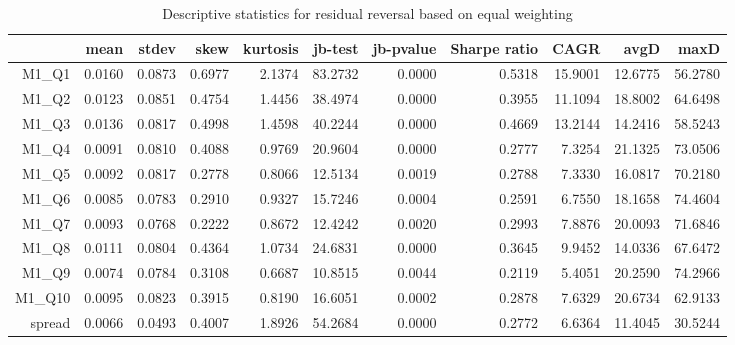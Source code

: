 \begin{table}[ht]
\centering
\begin{tabular}{rrrrrrrrrrr}
  \hline
 & mean & stdev & skew & kurtosis & jb-test & jb-pvalue & Sharpe ratio & CAGR & avgD & maxD \\ 
  \hline
M1\_Q1 & 0.0160 & 0.0873 & 0.6977 & 2.1374 & 83.2732 & 0.0000 & 0.5318 & 15.9001 & 12.6775 & 56.2780 \\ 
  M1\_Q2 & 0.0123 & 0.0851 & 0.4754 & 1.4456 & 38.4974 & 0.0000 & 0.3955 & 11.1094 & 18.8002 & 64.6498 \\ 
  M1\_Q3 & 0.0136 & 0.0817 & 0.4998 & 1.4598 & 40.2244 & 0.0000 & 0.4669 & 13.2144 & 14.2416 & 58.5243 \\ 
  M1\_Q4 & 0.0091 & 0.0810 & 0.4088 & 0.9769 & 20.9604 & 0.0000 & 0.2777 & 7.3254 & 21.1325 & 73.0506 \\ 
  M1\_Q5 & 0.0092 & 0.0817 & 0.2778 & 0.8066 & 12.5134 & 0.0019 & 0.2788 & 7.3330 & 16.0817 & 70.2180 \\ 
  M1\_Q6 & 0.0085 & 0.0783 & 0.2910 & 0.9327 & 15.7246 & 0.0004 & 0.2591 & 6.7550 & 18.1658 & 74.4604 \\ 
  M1\_Q7 & 0.0093 & 0.0768 & 0.2222 & 0.8672 & 12.4242 & 0.0020 & 0.2993 & 7.8876 & 20.0093 & 71.6846 \\ 
  M1\_Q8 & 0.0111 & 0.0804 & 0.4364 & 1.0734 & 24.6831 & 0.0000 & 0.3645 & 9.9452 & 14.0336 & 67.6472 \\ 
  M1\_Q9 & 0.0074 & 0.0784 & 0.3108 & 0.6687 & 10.8515 & 0.0044 & 0.2119 & 5.4051 & 20.2590 & 74.2966 \\ 
  M1\_Q10 & 0.0095 & 0.0823 & 0.3915 & 0.8190 & 16.6051 & 0.0002 & 0.2878 & 7.6329 & 20.6734 & 62.9133 \\ 
  spread & 0.0066 & 0.0493 & 0.4007 & 1.8926 & 54.2684 & 0.0000 & 0.2772 & 6.6364 & 11.4045 & 30.5244 \\ 
   \hline
\end{tabular}
\caption{Descriptive statistics for residual reversal based on equal weighting} 
\label{tab:returnRevStats}
\end{table}

